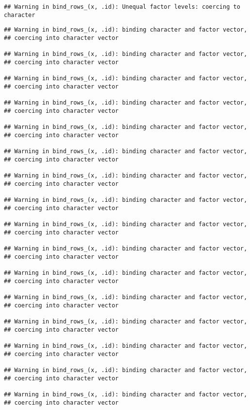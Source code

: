\documentclass[]{article}
\begin{document}
\begin{verbatim}
## Warning in bind_rows_(x, .id): Unequal factor levels: coercing to character
\end{verbatim}

\begin{verbatim}
## Warning in bind_rows_(x, .id): binding character and factor vector,
## coercing into character vector

## Warning in bind_rows_(x, .id): binding character and factor vector,
## coercing into character vector

## Warning in bind_rows_(x, .id): binding character and factor vector,
## coercing into character vector

## Warning in bind_rows_(x, .id): binding character and factor vector,
## coercing into character vector

## Warning in bind_rows_(x, .id): binding character and factor vector,
## coercing into character vector

## Warning in bind_rows_(x, .id): binding character and factor vector,
## coercing into character vector

## Warning in bind_rows_(x, .id): binding character and factor vector,
## coercing into character vector

## Warning in bind_rows_(x, .id): binding character and factor vector,
## coercing into character vector

## Warning in bind_rows_(x, .id): binding character and factor vector,
## coercing into character vector

## Warning in bind_rows_(x, .id): binding character and factor vector,
## coercing into character vector

## Warning in bind_rows_(x, .id): binding character and factor vector,
## coercing into character vector

## Warning in bind_rows_(x, .id): binding character and factor vector,
## coercing into character vector

## Warning in bind_rows_(x, .id): binding character and factor vector,
## coercing into character vector

## Warning in bind_rows_(x, .id): binding character and factor vector,
## coercing into character vector

## Warning in bind_rows_(x, .id): binding character and factor vector,
## coercing into character vector

## Warning in bind_rows_(x, .id): binding character and factor vector,
## coercing into character vector


\end{verbatim}
\end{document}

